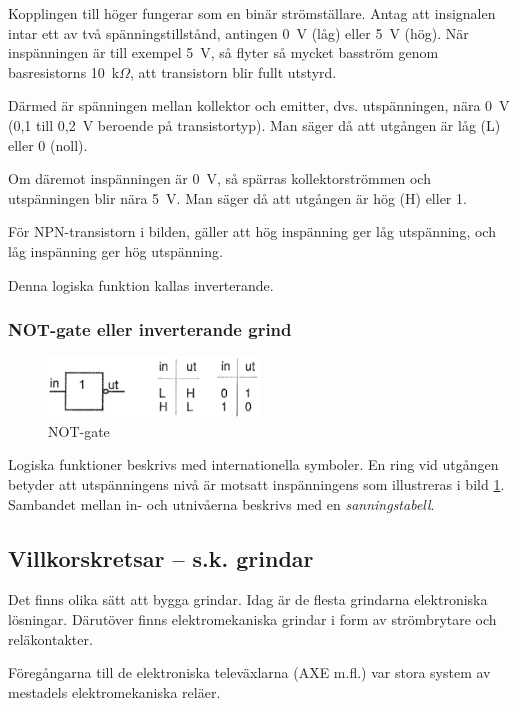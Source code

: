 Kopplingen till höger fungerar som en binär strömställare. Antag att insignalen
intar ett av två spänningstillstånd, antingen 0~V (låg) eller 5~V (hög). När
inspänningen är till exempel 5~V, så flyter så mycket basström genom basresistorns
10~k\(\Omega\), att transistorn blir fullt utstyrd.

Därmed är spänningen mellan kollektor och emitter, dvs. utspänningen, nära 0~V
(0,1 till 0,2~V beroende på transistortyp). Man säger då att utgången är låg (L)
eller 0 (noll).

Om däremot inspänningen är 0~V, så spärras kollektorströmmen och utspänningen
blir nära 5~V. Man säger då att utgången är hög (H) eller 1.

För NPN-transistorn i bilden, gäller att hög inspänning ger låg utspänning,
och låg inspänning ger hög utspänning.

Denna logiska funktion kallas inverterande.

\subsubsection{NOT-gate eller inverterande grind}

\begin{figure}
\includegraphics[width=0.5\textwidth]{images/cropped_pdfs/bild_2_2-36.pdf}
\caption{NOT-gate}
\label{fig:BildII2-36}
\end{figure}

Logiska funktioner beskrivs med internationella symboler.
En ring vid utgången betyder att utspänningens nivå är motsatt inspänningens
som illustreras i bild \ref{fig:BildII2-36}.
Sambandet mellan in- och utnivåerna beskrivs med en \emph{sanningstabell}.

\subsection{Villkorskretsar -- s.k. grindar}

Det finns olika sätt att bygga grindar. Idag är de flesta grindarna elektroniska
lösningar. Därutöver finns elektromekaniska grindar i form av strömbrytare och
reläkontakter.

Föregångarna till de elektroniska televäxlarna (AXE m.fl.) var stora system av
mestadels elektromekaniska reläer.

